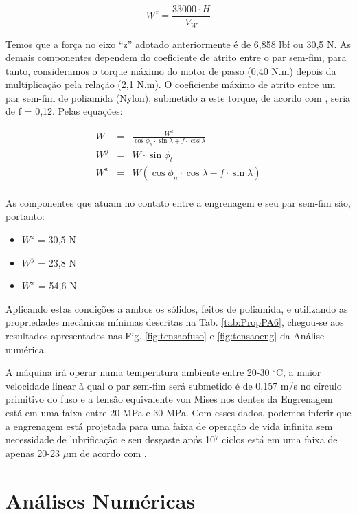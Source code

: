 \begin{equation}
    \label{eqpotenciaeng}
    W^z = \frac{33000 \cdot H}{V_W}
\end{equation}

Temos que a força no eixo “z” adotado anteriormente é de 6,858 lbf ou 30,5 N. As demais componentes dependem do coeficiente de atrito entre o par sem-fim, para tanto, consideramos o torque máximo do motor de passo (0,40 N.m) depois da multiplicação pela relação (2,1 N.m). O coeficiente máximo de atrito entre um par sem-fim de poliamida (Nylon), submetido a este torque, de acordo com \cite{starzhinsky2013}, seria de f  = 0,12. Pelas equações:

\begin{eqnarray}
    \label{compforc}
    W & = & \frac{W^z}{\cos{\phi_n}\cdot\sin{\lambda}+f\cdot \cos{\lambda}} \\
    \label{compforcy}
    W^y & = & W \cdot \sin{\phi_t} \\
    \label{compforcx}
    W^x & = & W (\cos{\phi_n} \cdot \cos{\lambda} - f \cdot \sin{\lambda}) \\
\end{eqnarray}

As componentes que atuam no contato entre a engrenagem e seu par sem-fim são, portanto:

\begin{itemize}
    \item $W^z$ = 30,5 N
    \item $W^y$ = 23,8 N
    \item $W^x$ = 54,6 N
\end{itemize} 

Aplicando estas condições a ambos os sólidos, feitos de poliamida, e utilizando as propriedades mecânicas mínimas descritas na Tab. \ref{tab:PropPA6}, chegou-se aos resultados apresentados nas Fig. \ref{fig:tensaofuso} e \ref{fig:tensaoeng} da Análise numérica.

A máquina irá operar numa temperatura ambiente entre 20-30 $^{\circ}$C, a maior velocidade linear à qual o par sem-fim será submetido é de 0,157 m/s no círculo primitivo do fuso e a tensão equivalente von Mises nos dentes da Engrenagem está em uma faixa entre 20 MPa e 30 MPa. Com esses dados, podemos inferir que a engrenagem está projetada para uma faixa de operação de vida infinita sem necessidade de lubrificação e seu desgaste após 10$^7$ ciclos está em uma faixa de apenas 20-23 $\mu$m de acordo com \cite{starzhinsky2013}.


\section{Análises Numéricas}

